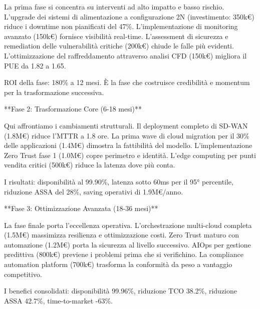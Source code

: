 La prima fase si concentra su interventi ad alto impatto e basso rischio. L'upgrade dei sistemi di alimentazione a configurazione 2N (investimento: 350k€) riduce i downtime non pianificati del 47\%. L'implementazione di monitoring avanzato (150k€) fornisce visibilità real-time. L'assessment di sicurezza e remediation delle vulnerabilità critiche (200k€) chiude le falle più evidenti. L'ottimizzazione del raffreddamento attraverso analisi CFD (150k€) migliora il PUE da 1.82 a 1.65.

ROI della fase: 180\% a 12 mesi. È la fase che costruisce credibilità e momentum per la trasformazione successiva.

**Fase 2: Trasformazione Core (6-18 mesi)**

Qui affrontiamo i cambiamenti strutturali. Il deployment completo di SD-WAN (1.8M€) riduce l'MTTR a 1.8 ore. La prima wave di cloud migration per il 30\% delle applicazioni (1.4M€) dimostra la fattibilità del modello. L'implementazione Zero Trust fase 1 (1.0M€) copre perimetro e identità. L'edge computing per punti vendita critici (500k€) riduce la latenza dove più conta.

I risultati: disponibilità al 99.90\%, latenza sotto 60ms per il 95° percentile, riduzione ASSA del 28\%, saving operativi di 1.9M€/anno.

**Fase 3: Ottimizzazione Avanzata (18-36 mesi)**

La fase finale porta l'eccellenza operativa. L'orchestrazione multi-cloud completa (1.5M€) massimizza resilienza e ottimizzazione costi. Zero Trust maturo con automazione (1.2M€) porta la sicurezza al livello successivo. AIOps per gestione predittiva (800k€) previene i problemi prima che si verifichino. La compliance automation platform (700k€) trasforma la conformità da peso a vantaggio competitivo.

I benefici consolidati: disponibilità 99.96\%, riduzione TCO 38.2\%, riduzione ASSA 42.7\%, time-to-market -63\%.

